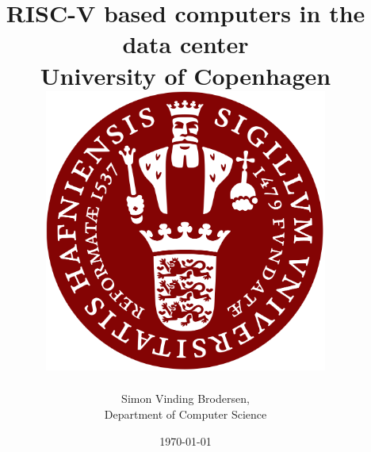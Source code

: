 \documentclass[a4paper, 12pt, twocolumn]{article}
\author{
{Simon Vinding Brodersen}, \\
\small Department of Computer Science
}
\title{
{RISC-V based computers in the data center} \\
{\large University of Copenhagen} \\[1em]
\includegraphics[width=0.7\textwidth]{./assets/images/Ku-ucph-logo-svg.svg.png}
}
\date{\today}
\begin{document}
\maketitle
\newpage

\twocolumn[\tableofcontents]
\newpage






\twocolumn[]
\end{document}
